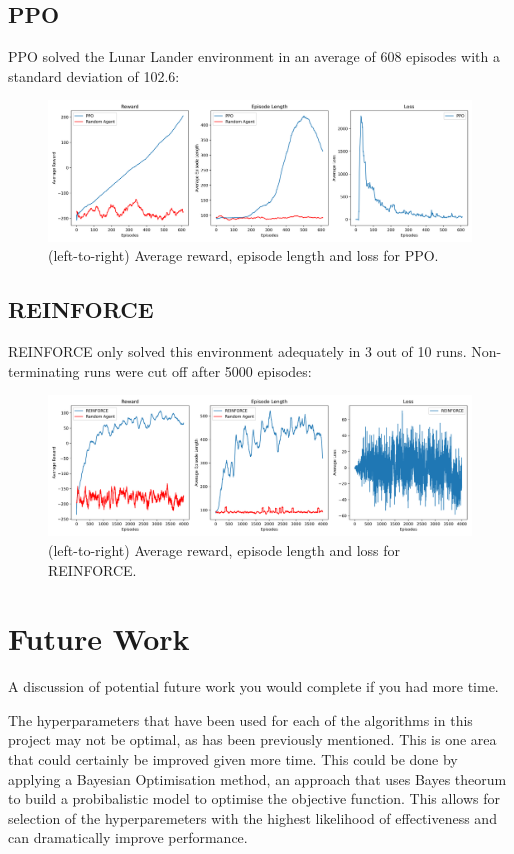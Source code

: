 \documentclass{article}
\begin{document}
\subsection{PPO}
PPO solved the Lunar Lander environment in an average of 608 episodes with a standard deviation of 102.6:
\begin{figure}[H]
  \centering
  \includegraphics[scale=0.35]{1.png}
  \caption{(left-to-right) Average reward, episode length and loss for PPO.}
\end{figure}
\subsection{REINFORCE}
REINFORCE only solved this environment adequately in 3 out of 10 runs. Non-terminating runs were cut off after 5000 episodes:
\begin{figure}[H]
  \centering
  \includegraphics[scale=0.35]{2.png}
  \caption{(left-to-right) Average reward, episode length and loss for REINFORCE.}
\end{figure}
\section{Future Work}
A discussion of potential future work you would complete if you had more
time.

The hyperparameters that have been used for each of the algorithms in this project may not be optimal, as has been previously mentioned. This is one area that could certainly be improved given more time. This could be done by applying a Bayesian Optimisation method, an approach that uses Bayes theorum to build a probibalistic model to optimise the objective function. This allows for selection of the hyperparemeters with the highest likelihood of effectiveness and can dramatically improve performance.
\end{document}
